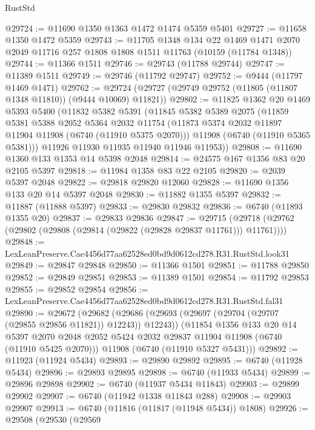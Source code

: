 \begin{lexlean}{RustStd}
\begin{coremodule}
@29724 := @11690 @1350 @1363 @1472 @1474 @5359 @5401
@29727 := @11658 @1350 @1472 @5359
@29743 := @11705
    @1348
    @134
    @22
    @1469
    @1471
    @2070
    @2049
    @11716
    @257
    @1808
    @1808
    @1511
    @11763
    (@10159 (@11784 @1348))
@29744 := @11366 @1511
@29746 := @29743 (@11788 @29744)
@29747 := @11389 @1511
@29749 := @29746 (@11792 @29747)
@29752 := @9444 (@11797 @1469 @1471)
@29762 := @29724 (@29727 (@29749 @29752 (@11805 (@11807 @1348 @11810)) (@9444 @10069) @11821))
@29802 := @11825
    @1362
    @20
    @1469
    @5393
    @5400
    (@11832
      @5382
      @5391
      (@11845
        @5382
        @5389
        @2075
        (@11859
          @5381
          @5388
          @2052
          @5364
          @2032
          @11754
          (@11873 @5374 @2032 @11897 @11904 @11908 (@6740 (@11910 @5375 @2070)))
          @11908
          (@6740 (@11910 @5365 @5381)))
        @11926
        @11930
        @11935
        @11940
        @11946
        @11953))
@29808 := @11690 @1360 @133 @1353 @14 @5398 @2048
@29814 := @24575 @167 @1356 @83 @20 @2105 @5397
@29818 := @11984 @1358 @83 @22 @2105
@29820 := @2039 @5397 @2048
@29822 := @29818 @29820 @12060
@29828 := @11690 @1356 @133 @20 @14 @5397 @2048
@29830 := @11882 @1355 @5397
@29832 := @11887 (@11888 @5397)
@29833 := @29830 @29832
@29836 := @6740 (@11893 @1355 @20)
@29837 := @29833 @29836
@29847 := @29715 (@29718 (@29762 (@29802 (@29808 (@29814 (@29822 (@29828 @29837 @11761))) @11761))))
@29848 := LexLeanPreserve.Cae4456d77aa62528ed0bd9d0612cd278.R31.RustStd.look31
@29849 := @29847 @29848
@29850 := @11366 @1501
@29851 := @11788 @29850
@29852 := @29849 @29851
@29853 := @11389 @1501
@29854 := @11792 @29853
@29855 := @29852 @29854
@29856 := LexLeanPreserve.Cae4456d77aa62528ed0bd9d0612cd278.R31.RustStd.fal31
@29890 := @29672
    (@29682
      (@29686 (@29693 (@29697 (@29704 (@29707 (@29855 @29856 @11821)) @12243)) @12243))
      (@11854
        @1356
        @133
        @20
        @14
        @5397
        @2070
        @2048
        @2052
        @5424
        @2032
        @29837
        @11904
        @11908
        (@6740 (@11910 @5425 @2070)))
      @11908
      (@6740 (@11910 @5327 @5431)))
@29892 := @11923 (@11924 @5434)
@29893 := @29890 @29892
@29895 := @6740 (@11928 @5434)
@29896 := @29893 @29895
@29898 := @6740 (@11933 @5434)
@29899 := @29896 @29898
@29902 := @6740 (@11937 @5434 @11843)
@29903 := @29899 @29902
@29907 := @6740 (@11942 @1338 @11843 @288)
@29908 := @29903 @29907
@29913 := @6740 (@11816 (@11817 (@11948 @5434)) @1808)
@29926 := @29508
    (@29530
      (@29569

\end{coremodule}
\end{lexlean}
